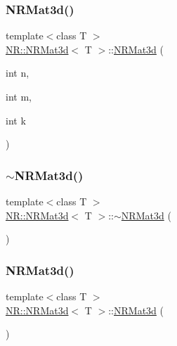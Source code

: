 \mbox{\label{classNR_1_1NRMat3d_a72437875f6affe5898dee887c3ebfe4c}} 
\subsubsection{\texorpdfstring{NRMat3d()}{NRMat3d()}\hspace{0.1cm}{\footnotesize\ttfamily [4/6]}}
{\footnotesize\ttfamily template$<$class T $>$ \\
\mbox{\hyperlink{classNR_1_1NRMat3d}{N\+R\+::\+N\+R\+Mat3d}}$<$ T $>$\+::\mbox{\hyperlink{classNR_1_1NRMat3d}{N\+R\+Mat3d}} (\begin{DoxyParamCaption}\item[{int}]{n,  }\item[{int}]{m,  }\item[{int}]{k }\end{DoxyParamCaption})}

\mbox{\label{classNR_1_1NRMat3d_a6c8dc36e24e162855f99ccfbc380ff52}} 
\subsubsection{\texorpdfstring{$\sim$NRMat3d()}{~NRMat3d()}\hspace{0.1cm}{\footnotesize\ttfamily [2/3]}}
{\footnotesize\ttfamily template$<$class T $>$ \\
\mbox{\hyperlink{classNR_1_1NRMat3d}{N\+R\+::\+N\+R\+Mat3d}}$<$ T $>$\+::$\sim$\mbox{\hyperlink{classNR_1_1NRMat3d}{N\+R\+Mat3d}} (\begin{DoxyParamCaption}{ }\end{DoxyParamCaption})}

\mbox{\label{classNR_1_1NRMat3d_a92498ec487349e85209cfad66e6b7d4e}} 
\subsubsection{\texorpdfstring{NRMat3d()}{NRMat3d()}\hspace{0.1cm}{\footnotesize\ttfamily [5/6]}}
{\footnotesize\ttfamily template$<$class T $>$ \\
\mbox{\hyperlink{classNR_1_1NRMat3d}{N\+R\+::\+N\+R\+Mat3d}}$<$ T $>$\+::\mbox{\hyperlink{classNR_1_1NRMat3d}{N\+R\+Mat3d}} (\begin{DoxyParamCaption}{ }\end{DoxyParamCaption})}


